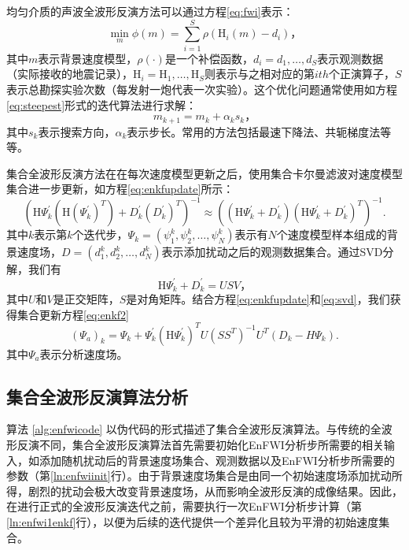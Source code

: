 均匀介质的声波全波形反演方法可以通过方程\ref{eq:fwi}表示：
\begin{equation}
\label{eq:fwi}
  \min_{m} \phi(m) = \sum_{i=1}^S \rho(\mbox{H}_i(m) - d_{i} )，
\end{equation}
其中$m$表示背景速度模型，$\rho(\cdot)$是一个补偿函数，$d_i=d_1, \ldots, d_S$表示观测数据（实际接收的地震记录），$\mbox{H}_i=\mbox{H}_1, \ldots, \mbox{H}_S$则表示与之相对应的第$i{th}$个正演算子，$S$表示总勘探实验次数（每发射一炮代表一次实验）。这个优化问题通常使用如方程\ref{eq:steepest}形式的迭代算法进行求解：
\begin{equation}
\label{eq:steepest}
m_{k+1} = m_{k} + \alpha_{k}s_k，
\end{equation}
其中$s_k$表示搜索方向，$\alpha_{k}$表示步长。常用的方法包括最速下降法、共轭梯度法等等。

集合全波形反演方法在在每次速度模型更新之后，使用集合卡尔曼滤波对速度模型集合进一步更新，如方程\ref{eq:enkfupdate}所示：
\begin{equation}
\label{eq:enkfupdate}
\left(\mbox{H}\Psi_k^{'}(\mbox{H}(\Psi_k^{'})^T)+D_k^{'}(D_k^{'})^T\right)^{-1}\approx\left((\mbox{H}\Psi_k^{'}+D_k^{'})(\mbox{H}\Psi_k^{'}+D_k^{'})^T\right)^{-1}.
\end{equation}
其中$k$表示第$k$个迭代步，$\Psi_k=(\psi_1^k,\psi_2^k,\ldots,\psi_N^k)$表示有$N$个速度模型样本组成的背景速度场，$D=(d_1^k,d_2^k,\ldots,d_N^k)$表示添加扰动之后的观测数据集合。通过SVD分解，我们有
\begin{equation}
\label{eq:svd}
\mbox{H}\Psi_k^{'}+D_k^{'}=USV，
\end{equation}
其中$U$和$V$是正交矩阵，$S$是对角矩阵。结合方程\ref{eq:enkfupdate}和\ref{eq:svd}，我们获得集合更新方程\ref{eq:enkf2}
\begin{equation}
\label{eq:enkf2}
(\Psi_a)_k=\Psi_k+\Psi_k^{'}(\mbox{H}\Psi_k^{'})^TU(SS^T)^{-1}U^T(D_k-H\Psi_k).
\end{equation}
其中$\Psi_a$表示分析速度场。

\subsection{集合全波形反演算法分析}
算法 \ref{alg:enfwicode} 以伪代码的形式描述了集合全波形反演算法。与传统的全波形反演不同，集合全波形反演算法首先需要初始化EnFWI分析步所需要的相关输入，如添加随机扰动后的背景速度场集合、观测数据以及EnFWI分析步所需要的参数（第\ref{ln:enfwiinit}行）。由于背景速度场集合是由同一个初始速度场添加扰动所得，剧烈的扰动会极大改变背景速度场，从而影响全波形反演的成像结果。因此，在进行正式的全波形反演迭代之前，需要执行一次EnFWI分析步计算（第\ref{ln:enfwi1enkf}行），以便为后续的迭代提供一个差异化且较为平滑的初始速度集合。

